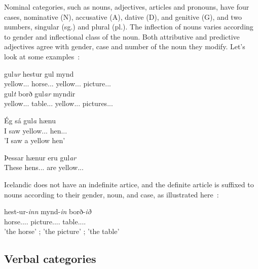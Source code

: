 \documentclass[12pt,%
    times,
]{lin-v2/lin}
\begin{document}
Nominal categories, such as nouns, adjectives, articles and pronouns, have four cases,
nominative (N), accusative (A), dative (D), and genitive (G), and two numbers, singular (sg.) and plural (pl.). 
The inflection of nouns varies according to gender and inflectional class of the noun.
Both attributive and predictive adjectives agree with gender, case and number of the noun they modify.
Let's look at some examples~\citep{icelandic}:
\begin{exe}
    \ex \begin{xlist}
        \item \gll gul\emph{ur} hestur gul mynd\\
                   yellow.\N.\Sg.\M{} horse.\N.\Sg.\M{} yellow.\N.\Sg.\F{} picture.\N.\Sg.\F\\
              \gll gul\emph{t} borð gul\emph{ar} myndir\\
                   yellow.\N.\Sg.\N{} table.\N.\Sg.\N{} yellow.\N.\Pl.\F{} pictures.\N.\Pl.\F\\
        \item \gll Ég sá gul\emph{a} hænu\\
                   I saw yellow.\Acc.\Sg.\F{} hen.\Acc.\Sg.\F\\
                   \trans 'I saw a yellow hen'
        \item \gll Þessar hænur eru gul\emph{ar}\\
                   These hens.\N.\Pl.\F{} are yellow.\N.\Pl.\F\\
        \end{xlist}
\end{exe}

Icelandic does not have an indefinite artice, and the definite article is suffixed to nouns
according to their gender, noun, and case, as illustrated here~\citep{icelandic}:
\begin{exe}
    \ex
        \gll    hest-ur-\emph{inn} mynd-\emph{in} borð-\emph{ið}\\
                horse.\Nom.\Sg.\M.\Def{} picture.\Nom.\Sg.\F.\Def{} table.\Nom.\Sg.\N.\Def\\
        \trans  'the horse' ; 'the picture' ; 'the table'
\end{exe}


\subsection{Verbal categories}
\end{document}
